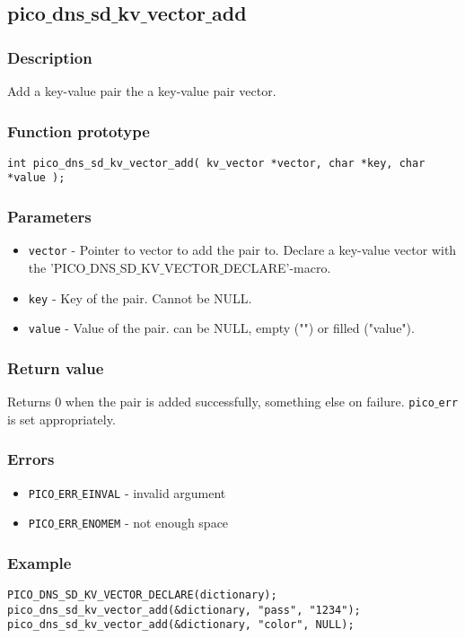 \subsection{pico$\_$dns$\_$sd$\_$kv$\_$vector$\_$add}

\subsubsection*{Description}
Add a key-value pair the a key-value pair vector.
\subsubsection*{Function prototype}
\begin{verbatim}
int pico_dns_sd_kv_vector_add( kv_vector *vector, char *key, char *value );
\end{verbatim}

\subsubsection*{Parameters}
\begin{itemize}[noitemsep]
\item \texttt{vector} - Pointer to vector to add the pair to. Declare a key-value vector with the 'PICO$\_$DNS$\_$SD$\_$KV$\_$VECTOR$\_$DECLARE'-macro.
\item \texttt{key} - Key of the pair. Cannot be NULL.
\item \texttt{value} - Value of the pair. can be NULL, empty ("") or filled ("value").
\end{itemize}

\subsubsection*{Return value}
Returns 0 when the pair is added successfully, something else on failure. \texttt{pico$\_$err} is set appropriately.

\subsubsection*{Errors}
\begin{itemize}[noitemsep]
\item \texttt{PICO$\_$ERR$\_$EINVAL} - invalid argument
\item \texttt{PICO$\_$ERR$\_$ENOMEM} - not enough space
\end{itemize}

\subsubsection*{Example}
\begin{verbatim}
PICO_DNS_SD_KV_VECTOR_DECLARE(dictionary);
pico_dns_sd_kv_vector_add(&dictionary, "pass", "1234");
pico_dns_sd_kv_vector_add(&dictionary, "color", NULL);
\end{verbatim}